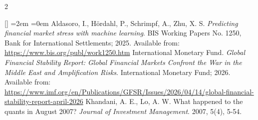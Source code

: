 \documentclass{book}
\begin{document}
\begin{multicols}{2}
\begin{list}{[]}{ %
\leftmargin=2em%
=0em%
\renewcommand{\makelabel}[1]{#1 \hfil}}
 Aldasoro, I., H{\"o}rdahl, P., Schrimpf, A., Zhu, X. S. {\it Predicting financial market stress with machine learning}. BIS Working Papers No. 1250, Bank for International Settlements; 2025. Available from: \url{https://www.bis.org/publ/work1250.htm}
 International Monetary Fund. {\it Global Financial Stability Report: Global Financial Markets Confront the War in the Middle East and Amplification Risks}. International Monetary Fund; 2026. Available from: \url{https://www.imf.org/en/Publications/GFSR/Issues/2026/04/14/global-financial-stability-report-april-2026}
 Khandani, A. E., Lo, A. W. What happened to the quants in August 2007? {\it Journal of Investment Management}. 2007, 5(4), 5-54.
\end{list}

\end{multicols}
\end{document}
